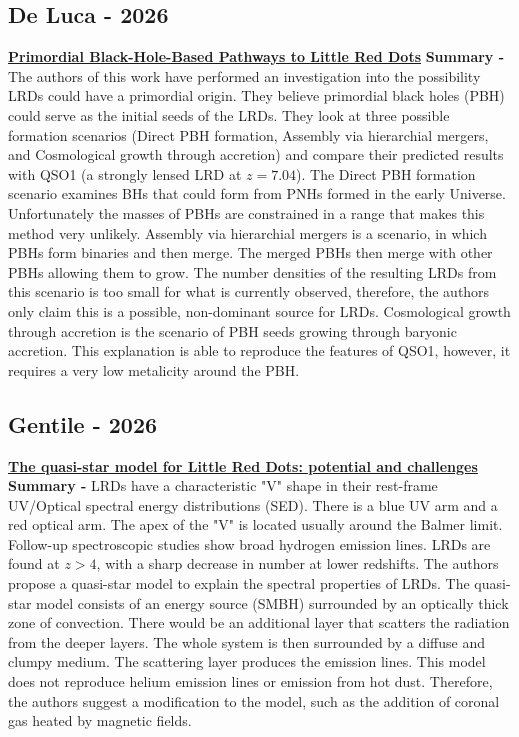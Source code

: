 \documentclass{article}
\begin{document}
\subsection*{De Luca - 2026}
\href{https://ui.adsabs.harvard.edu/abs/2026PhRvL.136w1402D}{\textbf{Primordial Black-Hole-Based Pathways to Little Red Dots}}
\newline \textbf{Summary -} The authors of this work have performed an investigation into the possibility LRDs could have a primordial origin. They believe primordial black holes (PBH) could serve as the initial seeds of the LRDs. They look at three possible formation scenarios (Direct PBH formation, Assembly via hierarchial mergers, and Cosmological growth through accretion) and compare their predicted results with QSO1 (a strongly lensed LRD at $z=7.04$). The Direct PBH formation scenario examines BHs that could form from PNHs formed in the early Universe. Unfortunately the masses of PBHs are constrained in a range that makes this method very unlikely. Assembly via hierarchial mergers is a scenario, in which PBHs form binaries and then merge. The merged PBHs then merge with other PBHs allowing them to grow. The number densities of the resulting LRDs from this scenario is too small for what is currently observed, therefore, the authors only claim this is a possible, non-dominant source for LRDs. Cosmological growth through accretion is the scenario of PBH seeds growing through baryonic accretion. This explanation is able to reproduce the features of QSO1, however, it requires a very low metalicity around the PBH.

\subsection*{Gentile - 2026}
\href{https://ui.adsabs.harvard.edu/abs/2026arXiv260606575G/abstract}{\textbf{The quasi-star model for Little Red Dots: potential and challenges}}
\newline \textbf{Summary -} LRDs have a characteristic "V" shape in their rest-frame UV/Optical spectral energy distributions (SED). There is a blue UV arm and a red optical arm. The apex of the "V" is located usually around the Balmer limit. Follow-up spectroscopic studies show broad hydrogen emission lines. LRDs are found at $z > 4$, with a sharp decrease in number at lower redshifts. The authors propose a quasi-star model to explain the spectral properties of LRDs. The quasi-star model consists of an energy source (SMBH) surrounded by an optically thick zone of convection. There would be an additional layer that scatters the radiation from the deeper layers. The whole system is then surrounded by a diffuse and clumpy medium. The scattering layer produces the emission lines. This model does not reproduce helium emission lines or emission from hot dust. Therefore, the authors suggest a modification to the model, such as the addition of coronal gas heated by magnetic fields.
\end{document}
